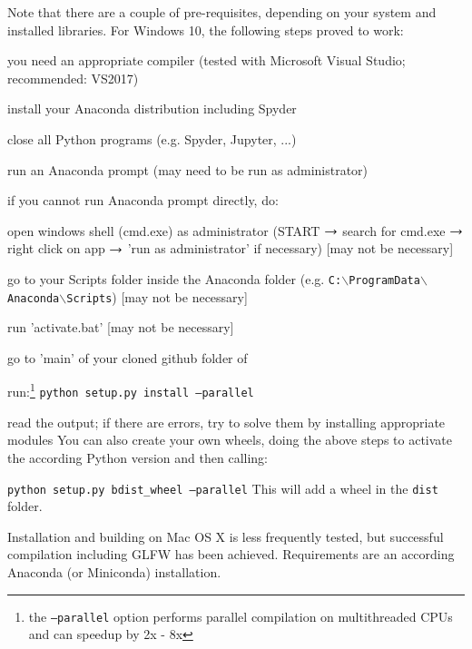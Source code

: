 Note that there are a couple of pre-requisites, depending on your system and installed libraries. For Windows 10, the following steps proved to work:
\bi
  \item you need an appropriate compiler (tested with Microsoft Visual Studio; recommended: VS2017)
  \item install your Anaconda distribution including Spyder
  \item close all Python programs (e.g. Spyder, Jupyter, ...) 
  \item run an Anaconda prompt (may need to be run as administrator)
  \item if you cannot run Anaconda prompt directly, do:
  \bi
    \item open windows shell (cmd.exe) as administrator (START $\rightarrow$ search for cmd.exe $\rightarrow$ right click on app $\rightarrow$ 'run as administrator' if necessary) [may not be necessary]
    \item go to your Scripts folder inside the Anaconda folder (e.g. \texttt{C:$\backslash$ProgramData$\backslash$Anaconda$\backslash$Scripts}) [may not be necessary]
    \item run 'activate.bat' [may not be necessary]
  \ei
  \item go to 'main' of your cloned github folder of \codeName\ 
  \item run:\footnote{the \texttt{--parallel} option performs parallel compilation on multithreaded CPUs and can speedup by 2x - 8x} \texttt{python setup.py install --parallel}
  \item read the output; if there are errors, try to solve them by installing appropriate modules
\ei
You can also create your own wheels, doing the above steps to activate the according Python version and then calling:
\bi
  \item[] \texttt{python setup.py bdist\_wheel --parallel}
\ei
This will add a wheel in the \texttt{dist} folder.

Installation and building on Mac OS X is less frequently tested, but successful compilation including GLFW has been achieved.
Requirements are an according Anaconda (or Miniconda) installation.

